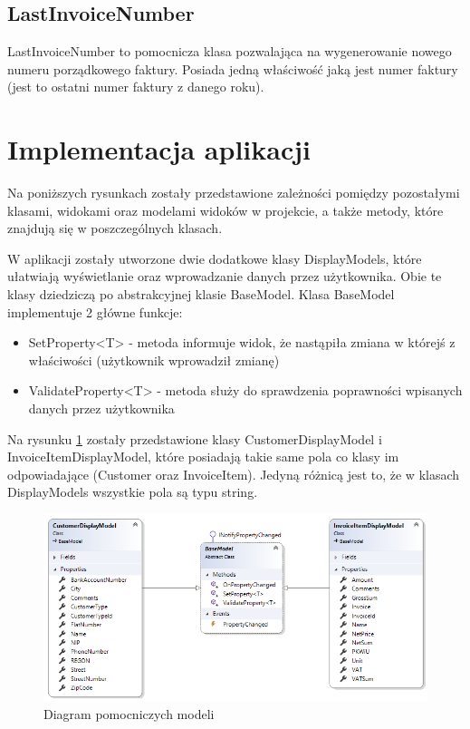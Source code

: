 \subsection{LastInvoiceNumber}
LastInvoiceNumber to pomocnicza klasa pozwalająca na wygenerowanie nowego numeru porządkowego faktury. Posiada jedną właściwość jaką jest numer faktury (jest to ostatni numer faktury z danego roku). 

\section{Implementacja aplikacji} %
Na poniższych rysunkach zostały przedstawione zależności pomiędzy pozostałymi klasami, widokami oraz modelami widoków w projekcie, a także metody, które znajdują się w poszczególnych klasach.

W aplikacji zostały utworzone dwie dodatkowe klasy DisplayModels, które ułatwiają wyświetlanie oraz wprowadzanie danych przez użytkownika. Obie te klasy dziedziczą po abstrakcyjnej klasie BaseModel. Klasa BaseModel implementuje 2 główne funkcje:

\begin{itemize}
    \item SetProperty<T> - metoda informuje widok, że nastąpiła zmiana w którejś z właściwości (użytkownik wprowadził zmianę)
    \item ValidateProperty<T> - metoda służy do sprawdzenia poprawności wpisanych danych przez użytkownika
\end{itemize}

Na rysunku \ref{fig:displayModelsDiagram} zostały przedstawione klasy CustomerDisplayModel i InvoiceItemDisplayModel, które posiadają takie same pola co klasy im odpowiadające (Customer oraz InvoiceItem). Jedyną różnicą jest to, że w klasach DisplayModels wszystkie pola są typu string.

\begin{figure}[ht!]
  \includegraphics[width=\linewidth]{Rysunki/DisplayModelsDiagram.png}
  \caption{Diagram pomocniczych modeli}
  \label{fig:displayModelsDiagram}
\end{figure}

